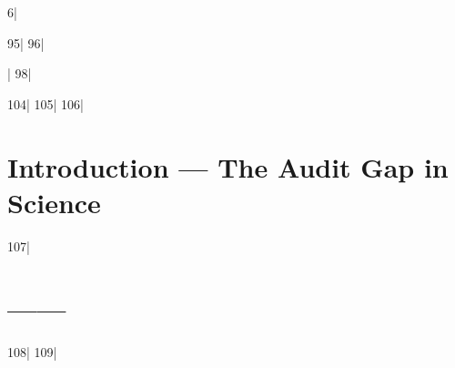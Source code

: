 6|\documentclass[12pt,a4paper]{article}
\begin{document}
95|
96||
98|\begin{abstract}
99|Every scientific claim rests on data. Every dataset has a minimum number $M$ of independent verifiers needed to certify its quality. We prove that the failure to declare $M$ is epistemically equivalent to fraud, and that declaring $M$ while falsifying data constitutes active evil. Using a game-theoretic signaling framework, we establish three fundamental theorems: (i)~a separating Perfect Bayesian Equilibrium exists under mandatory M-declaration, where honest researchers signal trivially while dishonest researchers face exponentially growing fabrication costs (Theorem~1); (ii)~in the absence of M-declaration, the posterior probability of fraud for any published claim is unbounded — M-declaration is information-theoretically necessary for quality certification (Theorem~2); (iii)~if a researcher declares $M$ and falsifies data, the probability of evading detection by all $M$ verifiers decays as $\exp(-2M\Delta^2)$, with $\lim_{t\to\infty}\Pbb(\text{detection})=1$ as the scientific community grows (Theorem~3). We formalize the M-Parameter Standard: every quantitative paper must declare $M_{\min}$ for its central claims, with default $\varepsilon = 0.05$. We decompose $M$ across disciplines (high-energy physics, psychology, deep learning) and introduce the \Cercis{} Score $S = Q + \eta N$ as an auditable scientific quality metric. The  (Geng) precedent demonstrates that even $M=1$ changes the equilibrium — imagine $M=100$. Science is humanity's cumulative intellectual achievement; M-declaration is the minimal epistemic hygiene standard.
100|
101||\noindent\textbf{Keywords:} scientific audit, M-parameter, game theory, signaling equilibrium, epistemic hygiene, data quality certification, replicability, SCX framework, , 
103|\end{abstract}
104|
105|%
106|\section{Introduction — The Audit Gap in Science}
107|\section{——}
108|\label{sec:intro}
109|%
\end{document}
